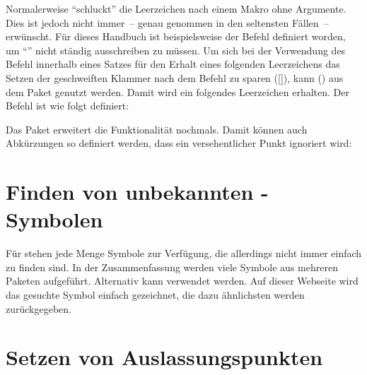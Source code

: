 Normalerweise \enquote{schluckt}  die Leerzeichen nach einem 
Makro ohne Argumente. Dies ist jedoch nicht immer~-- genau genommen in den 
seltensten Fällen~-- erwünscht. Für dieses Handbuch ist beispielsweise der 
Befehl  definiert worden, um \enquote{\TUD{}} nicht ständig 
ausschreiben zu müssen. Um sich bei der Verwendung des Befehl innerhalb eines 
Satzes für den Erhalt eines folgenden Leerzeichens das Setzen der geschweiften 
Klammer nach dem Befehl zu sparen ([\MPValue{}]), kann 
() aus dem Paket  genutzt werden. 
Damit wird ein folgendes Leerzeichen erhalten. Der Befehl  ist wie 
folgt definiert:
%
\begin{quoting}
\begin{Code}
\newcommand*{\TUD}{Technische Universit\"at Dresden\xspace}
\end{Code}
\end{quoting}
%
Das Paket  erweitert die Funktionalität nochmals. Damit 
können auch Abkürzungen so definiert werden, dass ein versehentlicher Punkt 
ignoriert wird:
%
\begin{quoting}
\begin{Code}
\newcommand*{\zB}{z.\,B\xperiod}
\end{Code}
\end{quoting}



\section{%
  Finden von unbekannten -Symbolen%
}

Für  stehen jede Menge Symbole zur Verfügung, die allerdings 
nicht immer einfach zu finden sind. In der Zusammenfassung
%
{}
werden viele Symbole aus mehreren Paketen aufgeführt. Alternativ kann 
 verwendet werden. 
Auf dieser Webseite wird das gesuchte Symbol einfach gezeichnet, die dazu 
ähnlichsten werden zurückgegeben.



\section{%
  Setzen von Auslassungspunkten%
  \label{sec:tips:dots}%
}

